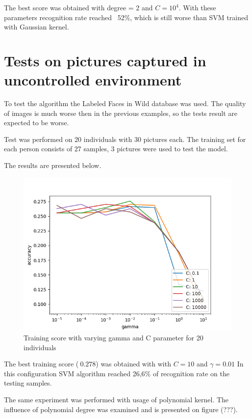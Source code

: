 The best score was obtained with degree = 2 and $C = 10^4$. With these parameters recognition rate reached ~52\%, which is still worse than SVM trained with Gaussian kernel.

\section{Tests on pictures captured in uncontrolled environment}

To test the algorithm the Labeled Faces in Wild database was used. The quality of images is much worse then in the previous examples, so the tests result are expected to be worse. 

Test was performed on 20 individuals with 30 pictures each. The training set for each person consists of 27 samples, 3 pictures were used to test the model. 

The results are presented below.

\begin{figure}[H]
\centering
\includegraphics[scale=0.75]{img/svm/better_graphs/lwf_rbf.png}
\caption{Training score with varying gamma and C parameter for 20 individuals}
\end{figure} 

The best training score ($~0.278$) was obtained with with $C = 10$ and $\gamma = 0.01$
In this configuration SVM algorithm reached 26,6\% of recognition rate on the testing samples.


The same experiment was performed with usage of polynomial kernel. 
The influence of polynomial degree was examined and is presented on figure (???).

